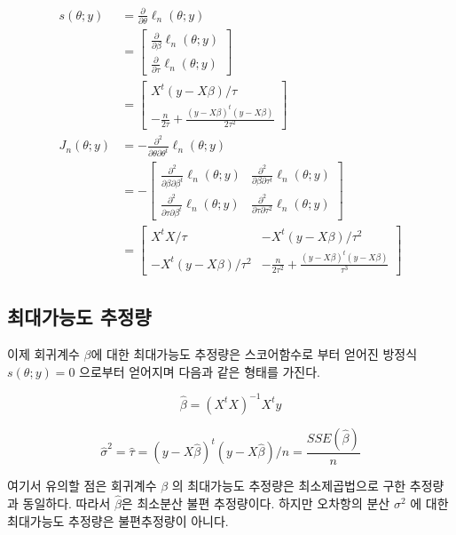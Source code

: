 \documentclass[
]{book}
\newcommand{\pardiff}[2]{\frac{\partial #1}{\partial #2 }}
\newcommand{\pardiffdd}[3]{\frac{\partial^2 #1}{\partial #2 \partial #3 }}
\theoremstyle{definition}
\theoremstyle{definition}
\theoremstyle{definition}
\theoremstyle{remark}
\begin{document}
\begin{align*}
s( \theta;  y) & =  \pardiff{}{ \theta}\ell_n( \theta;  y ) \\
  & =  \begin{bmatrix}
    \pardiff{}{ \beta}\ell_n( \theta;  y ) \\
    \pardiff{}{\tau}\ell_n( \theta;  y ) 
  \end{bmatrix} \\
  & = 
  \begin{bmatrix}
     X^t ( y- X  \beta)/\tau \\
    -\frac{n}{2\tau} +\frac { ( y- X  \beta)^t ( y- X  \beta) }{2\tau^2} 
  \end{bmatrix} \\
 J_n( \theta;  y) & =  -\pardiffdd{}{ \theta}{ \theta^t}\ell_n( \theta;y ) \\
  & = 
  - \begin{bmatrix}
    \pardiffdd{}{\beta}{ \beta^t}\ell_n( \theta;y ) & \pardiffdd{}{ \beta}{\tau^t}\ell_n( \theta;y )  \\
    \pardiffdd{}{\tau}{ \beta^t}\ell_n( \theta;y )  & \pardiffdd{}{\tau}{\tau^2}\ell_n( \theta;y ) 
  \end{bmatrix} \\
   & = 
  \begin{bmatrix}
      X^t  X /\tau &  - X^t ( y- X  \beta)/\tau^2   \\
    - X^t ( y- X  \beta)/\tau^2  &  - \frac{n}{2\tau^2} +\frac { ( y- X  \beta)^t ( y- X  \beta) }{\tau^3} 
  \end{bmatrix}
\end{align*}

\hypertarget{uxcd5cuxb300uxac00uxb2a5uxb3c4-uxcd94uxc815uxb7c9}{%
\subsection{최대가능도 추정량}\label{uxcd5cuxb300uxac00uxb2a5uxb3c4-uxcd94uxc815uxb7c9}}

이제 회귀계수 \(\beta\)에 대한 최대가능도 추정량은 스코어함수로 부터 얻어진 방정식 \(s( \theta; y)= 0\) 으로부터 얻어지며 다음과 같은 형태를 가진다.

\[ \hat { \beta} = ( X^t  X)^{-1}  X^t  y \]

\[   \hat \sigma^2 = \hat \tau = ( y- X  {\hat \beta})^t ( y- X  {\hat \beta})/n = \frac{SSE(\hat{ \beta})}{n} \]

여기서 유의할 점은 회귀계수 \(\beta\) 의 최대가능도 추정량은 최소제곱법으로 구한 추정량과 동일하다. 따라서 \(\hat { \beta}\)은 최소분산 불편 추정량이다. 하지만 오차항의 분산 \(\sigma^2\) 에 대한 최대가능도 추정량은 불편추정량이 아니다.
\end{document}
